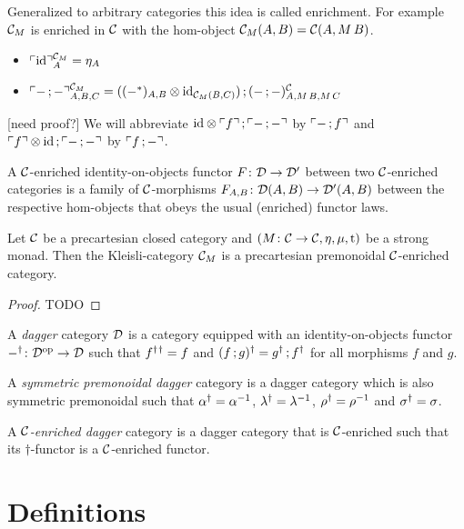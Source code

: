 \documentclass[runningheads,envcountsame]{llncs}
\newcommand{\monad}{M}
\newcommand{\homCM}[3][]{\homJ{#2}{\C_\monad}{#3}}
\begin{document}
Generalized to arbitrary categories this idea is called enrichment. For example $\C_\monad$ is enriched in $\C$ with the hom-object $\homCM{A}{B} = \homC{A}{\monad\,B}$.
\begin{itemize}
    \item $\name[\C_\monad]{\id}_A = \eta_A$
    \item $\name[\C_\monad]{\comp{-}{-}}_{A,B,C} = \comp{(\tensor{(-^*)_{A,B}}{\id_{\homCM{B}{C}}})}{(\comp{-}{-})^\C_{A, \monad\,B, \monad\,C}}$
\end{itemize} [need proof?]
We will abbreviate $\comp{\tensor{\id}{\name{f}}}{\name{\comp{-}{-}}}$ by $\name{\comp{-}{f}}$ and $\comp{\tensor{\name{f}}{\id}}{\name{\comp{-}{-}}}$ by $\name{\comp{f}{-}}$.

A $\C$-enriched identity-on-objects functor $F\colon \D \to \D'$ between two $\C$-enriched categories is a family of $\C$-morphisms $F_{A,B}\colon \homJ{A}{\D}{B} \to \homJ{A}{\D'}{B}$ between the respective hom-objects that obeys the usual (enriched) functor laws.

\begin{lemma}
    Let $\C$ be a precartesian closed category and $(\monad\colon \C \to \C, \munit, \mjoin, \mstrength)$ be a strong monad. Then the Kleisli-category $\C_\monad$ is a precartesian premonoidal $\C$-enriched category.
\end{lemma}
\begin{proof}
    TODO
\end{proof}

\begin{definition}
    A \emph{dagger} category $\D$ is a category equipped with an identity-on-objects functor $\rev{-}\colon \op{\D} \to \D$ such that $\rev{f}\rev{{}} = f$ and $\rev{(\comp{f}{g})} = \comp{\rev{g}}{\rev{f}}$ for all morphisms $f$ and $g$.
    
    A \emph{symmetric premonoidal dagger} category is a dagger category which is also symmetric premonoidal such that $\rev{\assoc} = \assoc^{-1}$, $\rev{\unitl} = \unitl^{-1}$, $\rev{\unitr} = \unitr^{-1}$ and $\rev{\swap} = \swap$.
    
    A \emph{$\C$-enriched dagger} category is a dagger category that is $\C$-enriched such that  its $\dagger$-functor is a $\C$-enriched functor.
\end{definition}

\section{Definitions}
\end{document}
